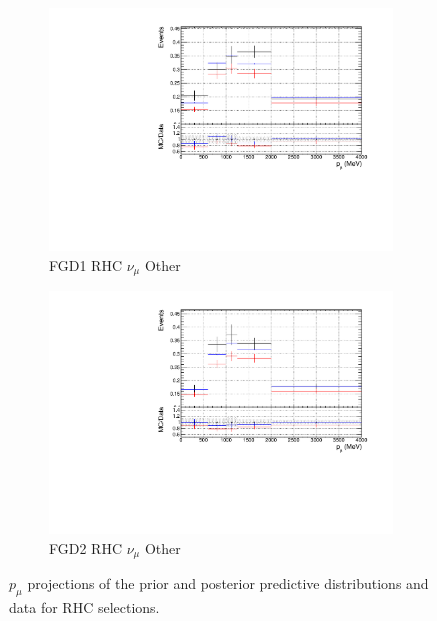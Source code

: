 \begin{figure}[!h]
\begin{subfigure}{0.49\textwidth}
  \centering
  \includegraphics[width=\textwidth]{figs/priorpred1D_p_FGD1_NuMuBkg_CCOther_in_AntiNu_Mode}
  \caption{FGD1 RHC $\nu_{\mu}$ Other}
\end{subfigure}
\begin{subfigure}{0.49\textwidth}
  \centering
  \includegraphics[width=\textwidth]{figs/priorpred1D_p_FGD2_NuMuBkg_CCOther_in_AntiNu_Mode}
  \caption{FGD2 RHC $\nu_{\mu}$ Other}
\end{subfigure}
\caption{$p_{\mu}$ projections of the prior and posterior predictive distributions and data for RHC \numu selections.}
\label{fig:priorpost_rhc_numu_p}
\end{figure}

